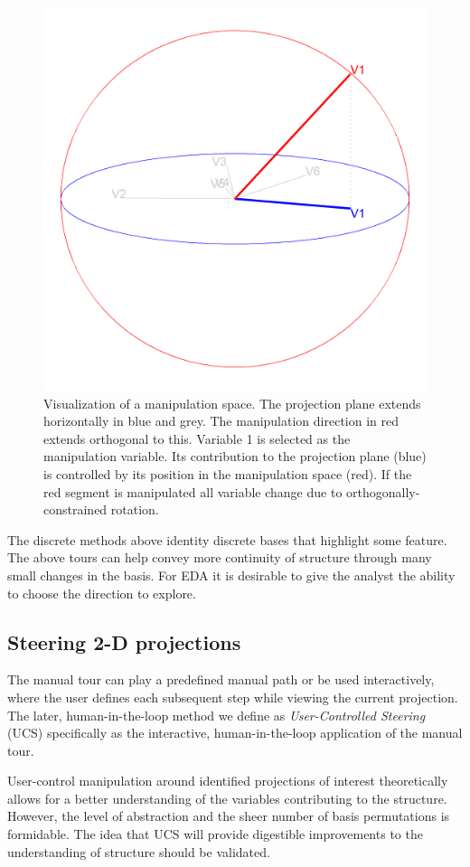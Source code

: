 \documentclass[
  11,
]{article}
\begin{document}
\begin{figure}[h]

{\centering \includegraphics[width=0.6\linewidth,]{./figures/manipSp} 

}

\caption{Visualization of a manipulation space. The projection plane extends horizontally in blue and grey. The manipulation direction in red extends orthogonal to this. Variable 1 is selected as the manipulation variable. Its contribution to the projection plane (blue) is controlled by its position in the manipulation space (red). If the red segment is manipulated all variable change due to orthogonally-constrained rotation.}\label{fig:manipSp}
\end{figure}

The discrete methods above identity discrete bases that highlight some feature. The above tours can help convey more continuity of structure through many small changes in the basis. For EDA it is desirable to give the analyst the ability to choose the direction to explore.

\hypertarget{steering-2-d-projections}{%
\subsection{Steering 2-D projections}\label{steering-2-d-projections}}

The manual tour can play a predefined manual path or be used interactively, where the user defines each subsequent step while viewing the current projection. The later, human-in-the-loop method we define as \emph{User-Controlled Steering} (UCS) specifically as the interactive, human-in-the-loop application of the manual tour.

User-control manipulation around identified projections of interest theoretically allows for a better understanding of the variables contributing to the structure. However, the level of abstraction and the sheer number of basis permutations is formidable. The idea that UCS will provide digestible improvements to the understanding of structure should be validated.
\end{document}

